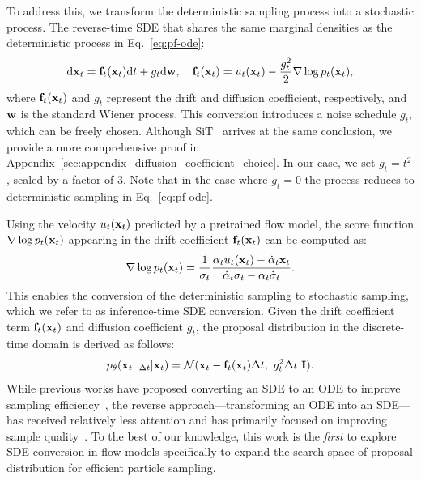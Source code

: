 To address this, we transform the deterministic sampling process into a stochastic process. 
The reverse-time SDE that shares the same marginal densities as the deterministic process in Eq.~\ref{eq:pf-ode}:
\begin{align}
    \label{eq:reverse_sde}
    \mathrm{d} \mathbf{x}_t = \mathbf{f}_t(\mathbf{x}_t) \mathrm{d} t + g_t \mathrm{d} \mathbf{w}, \quad
    \mathbf{f}_t(\mathbf{x}_t) = u_{t}(\mathbf{x}_t) - \frac{g_t^2}{2} \nabla \log p_t(\mathbf{x}_t),
\end{align}
where $\mathbf{f}_t(\mathbf{x}_t)$ and $g_t$ represent the drift and diffusion coefficient, respectively, and $\mathbf{w}$ is the standard Wiener process. 
This conversion introduces a noise schedule $g_t$, which can be freely chosen. Although SiT~\cite{Ma2024:sit} arrives at the same conclusion, we provide a more comprehensive proof in Appendix~\ref{sec:appendix_diffusion_coefficient_choice}. 
In our case, we set $g_t = t^2$, scaled by a factor of 3. 
Note that in the case where $g_t=0$ the process reduces to deterministic sampling in Eq.~\ref{eq:pf-ode}.


Using the velocity $u_{t}(\mathbf{x}_t)$ predicted by a pretrained flow model, the score function $\nabla \log p_t(\mathbf{x}_t)$ appearing in the drift coefficient $\mathbf{f}_t(\mathbf{x}_t)$ can be computed as:
\begin{align}
    \label{eq:score_velocity}
    \nabla \log p_t (\mathbf{x}_t) = \frac{1}{\sigma_t} \frac{\alpha_t u_{t}(\mathbf{x}_t) - \dot{\alpha}_t \mathbf{x}_t}{\dot{\alpha}_t \sigma_t - \alpha_t \dot{\sigma}_t}.
\end{align}
This enables the conversion of the deterministic sampling to stochastic sampling, which we refer to as inference-time SDE conversion. 
Given the drift coefficient term $\mathbf{f}_t(\mathbf{x}_t)$ and diffusion coefficient $g_t$, the proposal distribution in the discrete-time domain is derived as follows:
\begin{align}
    \label{eq:proposal_dist_sde}
    p_\theta(\B{x}_{t-\Delta t} | \B{x}_t) = \mathcal{N}(\B{x}_t - \B{f}_t(\B{x}_t) \Delta t,\ 
     g_t^2 \Delta t\ \mathbf{I}).
\end{align}
While previous works have proposed converting an SDE to an ODE to improve sampling efficiency~\cite{Karras2022:EDM, Song2020:DDIM, Lu2022:DPM, Song:2021SDE}, the reverse approach—transforming an ODE into an SDE—has received relatively less attention and has primarily focused on improving sample quality~\cite{xu2023restart, Ma2024:sit}. 
To the best of our knowledge, this work is the \emph{first} to explore SDE conversion in flow models specifically to expand the search space of proposal distribution for efficient particle sampling. 


